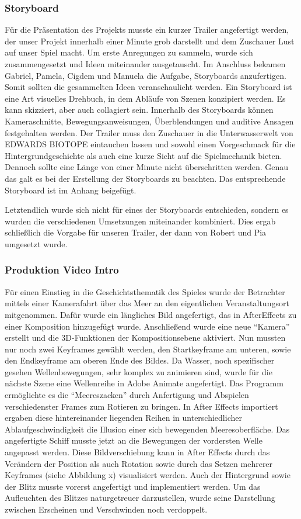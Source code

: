 \subsubsection{Storyboard}
Für die Präsentation des Projekts musste ein kurzer Trailer angefertigt werden, der unser Projekt innerhalb einer Minute grob darstellt und dem Zuschauer Lust auf unser Spiel macht. Um erste Anregungen zu sammeln, wurde sich zusammengesetzt und Ideen miteinander ausgetauscht. Im Anschluss bekamen Gabriel, Pamela, Cigdem und Manuela die Aufgabe, Storyboards anzufertigen. Somit sollten die gesammelten Ideen veranschaulicht werden.
Ein Storyboard ist eine Art visuelles Drehbuch, in dem Abläufe von Szenen konzipiert werden. Es kann skizziert, aber auch collagiert sein. Innerhalb des Storyboards können Kameraschnitte, Bewegungsanweisungen, Überblendungen und auditive Ansagen festgehalten werden.
Der Trailer muss den Zuschauer in die Unterwasserwelt von EDWARDS BIOTOPE eintauchen lassen und sowohl einen Vorgeschmack für die Hintergrundgeschichte als auch eine kurze Sicht auf die Spielmechanik bieten. Dennoch sollte eine Länge von einer Minute nicht überschritten werden. Genau das galt es bei der Erstellung der Storyboards zu beachten. Das entsprechende Storyboard ist im Anhang beigefügt. 

Letztendlich wurde sich nicht für eines der Storyboards entschieden, sondern es wurden die verschiedenen Umsetzungen miteinander kombiniert. Dies ergab schließlich die Vorgabe für unseren Trailer, der dann von Robert und Pia umgesetzt wurde.


\subsubsection{Produktion Video Intro}
Für einen Einstieg in die Geschichtsthematik des Spieles wurde der Betrachter mittels einer Kamerafahrt über das Meer an den eigentlichen Veranstaltungsort mitgenommen.
Dafür wurde ein längliches Bild angefertigt, das in AfterEffects zu einer Komposition hinzugefügt wurde. Anschließend wurde eine neue “Kamera” erstellt und die 3D-Funktionen der Kompositionsebene aktiviert. Nun mussten nur noch zwei Keyframes gewählt werden, den Startkeyframe am unteren, sowie den Endkeyframe am oberen Ende des Bildes.
Da Wasser, noch spezifischer gesehen Wellenbewegungen, sehr komplex zu animieren sind, wurde für die nächste Szene eine Wellenreihe in Adobe Animate angefertigt. Das Programm ermöglichte es die “Meereszacken” durch Anfertigung und Abspielen verschiedenster Frames zum Rotieren zu bringen. In After Effects importiert ergaben diese hintereinander liegenden Reihen in unterschiedlicher Ablaufgeschwindigkeit die Illusion einer sich bewegenden Meeresoberfläche. 
Das angefertigte Schiff musste jetzt an die Bewegungen der vordersten Welle angepasst werden. Diese Bildverschiebung kann in After Effects durch das Verändern der Position als auch Rotation sowie durch das Setzen mehrerer Keyframes (siehe Abbildung x) visualisiert werden. Auch der Hintergrund sowie der Blitz musste vorerst angefertigt und implementiert werden. Um das Aufleuchten des Blitzes naturgetreuer darzustellen, wurde seine Darstellung zwischen Erscheinen und Verschwinden noch verdoppelt. 

